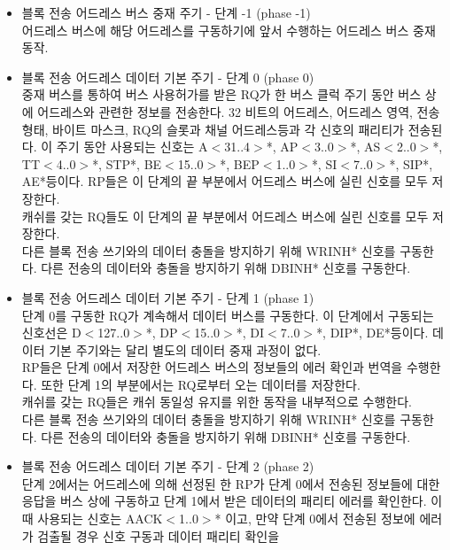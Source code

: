 \begin{itemize}
	\item 블록 전송 어드레스 버스 중재 주기 - 단계 -1 (phase -1)\\
	어드레스 버스에 해당 어드레스를 구동하기에 앞서 수행하는 어드레스 버스 중재 동작.
	\item 블록 전송 어드레스 데이터 기본 주기 - 단계 0 (phase 0)\\
	중재 버스를 통하여 버스 사용허가를 받은 RQ가 한 버스 클럭 주기 동안 
	버스 상에 어드레스와 관련한 정보를 전송한다.
	32 비트의 어드레스, 어드레스 영역, 전송 형태, 바이트 마스크, RQ의 슬롯과
	채널 어드레스등과 각 신호의 패리티가 전송된다.
	이 주기 동안 사용되는 신호는 A$<$31..4$>$*, AP$<$3..0$>$*,
	AS$<$2..0$>$*, TT$<$4..0$>$*, STP*,
	BE$<$15..0$>$*, BEP$<$1..0$>$*,
	SI$<$7..0$>$*, SIP*, AE*등이다.
	RP들은 이 단계의 끝 부분에서 어드레스 버스에 실린 신호를 모두 저장한다. \\
	캐쉬를 갖는 RQ들도 이 단계의 끝 부분에서 어드레스 버스에 실린 신호를 모두 저장한다. \\
	다른 블록 전송 쓰기와의 데이터 충돌을 방지하기 위해 WRINH* 신호를 구동한다.
	다른 전송의 데이터와 충돌을 방지하기 위해 DBINH* 신호를 구동한다.
%
	\item 블록 전송 어드레스 데이터 기본 주기 - 단계 1 (phase 1)\\
	단계 0를 구동한 RQ가 계속해서 데이터 버스를 구동한다.
	이 단계에서 구동되는 신호선은 D$<$127..0$>$*,
	DP$<$15..0$>$*, DI$<$7..0$>$*, DIP*, DE*등이다.
	데이터 기본 주기와는 달리 별도의 데이터 중재 과정이 없다. \\
	RP들은 단계 0에서 저장한 어드레스 버스의 정보들의 에러 확인과 번역을 수행한다.
	또한 단계 1의 부분에서는 RQ로부터 오는 데이터를 저장한다. \\
	캐쉬를 갖는 RQ들은 캐쉬 동일성 유지를 위한 동작을 내부적으로 수행한다. \\
	다른 블록 전송 쓰기와의 데이터 충돌을 방지하기 위해 WRINH* 신호를 구동한다.
	다른 전송의 데이터와 충돌을 방지하기 위해 DBINH* 신호를 구동한다.
%
	\item 블록 전송 어드레스 데이터 기본 주기 - 단계 2 (phase 2)\\
	단계 2에서는 어드레스에 의해 선정된 한 RP가 단계 0에서 전송된 정보들에
	대한 응답을 버스 상에 구동하고 단계 1에서 받은 데이터의 패리티 에러를 확인한다.
	이때 사용되는 신호는 AACK$<$1..0$>$* 이고,
	만약 단계 0에서 전송된 정보에 에러가 검출될 경우 신호 구동과 데이터 패리티 확인을

\end{itemize}
